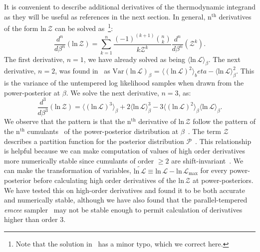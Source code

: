 It is convenient to describe additional derivatives of the thermodynamic integrand as they will be useful as references in the next section. In general, $\mathrm{n}^{\mathrm{th}}$ derivatives of the form $\mathrm{ln} \, \mathcal{Z}$ can be solved as~\citep{gradshteyn2015table}\footnote{Note that the solution in~\cite{gradshteyn2015table} has a minor typo, which we correct here.}:
\begin{equation}\label{eqn:gradshteyn_derivatives}
    \frac{d^n}{d\beta^n}\left( \mathrm{ln} \, \mathcal{Z} \right) = \sum_{k=1}^{n} \frac{(-1)^{(k+1)} {{n}\choose{k}}}{k \mathcal{Z}^k} \frac{d^n}{d\beta^n} \left(\mathcal{Z}^k\right).
\end{equation}
The first derivative, $n=1$, we have already solved as being $\langle \mathrm{ln} \, \mathcal{L} \rangle_\beta$. The next derivative, $n=2$, was found in~\cite{friel2014improving} as $\mathrm{Var}(\mathrm{ln} \, \mathcal{L})_\beta$ = $\langle (\mathrm{ln} \, \mathcal{L})^2\rangle_beta - \langle \mathrm{ln} \, \mathcal{L} \rangle^2_\beta$. This is the variance of the untempered log likelihood samples when drawn from the power-posterior at $\beta$. We solve the next derivative, $n=3$, as:
\begin{equation}\label{eqn:third_ti_deriv}
    \frac{d^3}{d\beta^3}\left( \mathrm{ln} \, \mathcal{Z}\right) = \langle \left(\mathrm{ln} \, \mathcal{L} \right)^3\rangle_\beta + 2 \langle \mathrm{ln} \, \mathcal{L} \rangle^3_\beta - 3 \langle \left(\mathrm{ln} \, \mathcal{L} \right)^2\rangle_\beta \langle \mathrm{ln} \, \mathcal{L}\rangle_\beta.
\end{equation}
We observe that the pattern is that the $\mathrm{n}^{\mathrm{th}}$ derivative of $\mathrm{ln} \, \mathcal{Z}$ follow the pattern of the $\mathrm{n}^{\mathrm{th}}$ cumulants~\citep{kardar2007statistical} of the power-posterior distribution at $\beta$~\cite{friel2014improving, lamont2019correspondence}. The term $\mathcal{Z}$ describes a partition function for the posterior distribution $\mathcal{P}$~\citep{carlson2016partition, lamont2019correspondence}. This relationship is helpful because we can make computation of values of high order derivatives more numerically stable since cumulants of order $\ge 2$ are shift-invariant~\cite{kardar2007statistical}. We can make the transformation of variables, $\widetilde{\mathrm{ln} \, \mathcal{L}} \equiv \mathrm{ln} \, \mathcal{L} - \mathrm{ln} \, \mathcal{L}_{\mathrm{max}}$ for every power-posterior before calculating high order derivatives of the $\mathrm{ln} \, \mathcal{Z}$ at power-posteriors. We have tested this on high-order derivatives and found it to be both accurate and numerically stable, although we have also found that the parallel-tempered \emph{emcee} sampler~\citep{emcee,vousden:2016} may not be stable enough to permit calculation of derivatives higher than order $3$.


